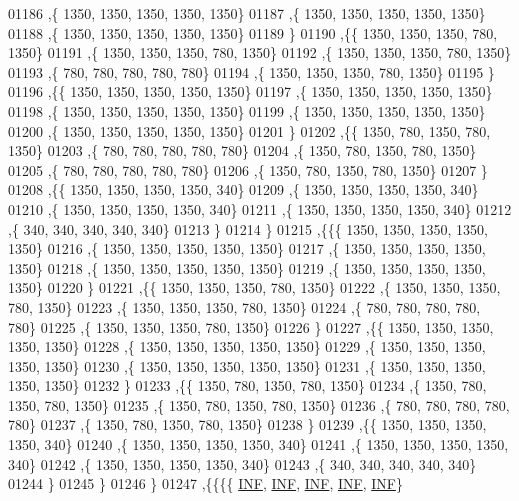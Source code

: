 \begin{DoxyCode}
01186    ,\{  1350,  1350,  1350,  1350,  1350\}
01187    ,\{  1350,  1350,  1350,  1350,  1350\}
01188    ,\{  1350,  1350,  1350,  1350,  1350\}
01189    \}
01190   ,\{\{  1350,  1350,  1350,   780,  1350\}
01191    ,\{  1350,  1350,  1350,   780,  1350\}
01192    ,\{  1350,  1350,  1350,   780,  1350\}
01193    ,\{   780,   780,   780,   780,   780\}
01194    ,\{  1350,  1350,  1350,   780,  1350\}
01195    \}
01196   ,\{\{  1350,  1350,  1350,  1350,  1350\}
01197    ,\{  1350,  1350,  1350,  1350,  1350\}
01198    ,\{  1350,  1350,  1350,  1350,  1350\}
01199    ,\{  1350,  1350,  1350,  1350,  1350\}
01200    ,\{  1350,  1350,  1350,  1350,  1350\}
01201    \}
01202   ,\{\{  1350,   780,  1350,   780,  1350\}
01203    ,\{   780,   780,   780,   780,   780\}
01204    ,\{  1350,   780,  1350,   780,  1350\}
01205    ,\{   780,   780,   780,   780,   780\}
01206    ,\{  1350,   780,  1350,   780,  1350\}
01207    \}
01208   ,\{\{  1350,  1350,  1350,  1350,   340\}
01209    ,\{  1350,  1350,  1350,  1350,   340\}
01210    ,\{  1350,  1350,  1350,  1350,   340\}
01211    ,\{  1350,  1350,  1350,  1350,   340\}
01212    ,\{   340,   340,   340,   340,   340\}
01213    \}
01214   \}
01215  ,\{\{\{  1350,  1350,  1350,  1350,  1350\}
01216    ,\{  1350,  1350,  1350,  1350,  1350\}
01217    ,\{  1350,  1350,  1350,  1350,  1350\}
01218    ,\{  1350,  1350,  1350,  1350,  1350\}
01219    ,\{  1350,  1350,  1350,  1350,  1350\}
01220    \}
01221   ,\{\{  1350,  1350,  1350,   780,  1350\}
01222    ,\{  1350,  1350,  1350,   780,  1350\}
01223    ,\{  1350,  1350,  1350,   780,  1350\}
01224    ,\{   780,   780,   780,   780,   780\}
01225    ,\{  1350,  1350,  1350,   780,  1350\}
01226    \}
01227   ,\{\{  1350,  1350,  1350,  1350,  1350\}
01228    ,\{  1350,  1350,  1350,  1350,  1350\}
01229    ,\{  1350,  1350,  1350,  1350,  1350\}
01230    ,\{  1350,  1350,  1350,  1350,  1350\}
01231    ,\{  1350,  1350,  1350,  1350,  1350\}
01232    \}
01233   ,\{\{  1350,   780,  1350,   780,  1350\}
01234    ,\{  1350,   780,  1350,   780,  1350\}
01235    ,\{  1350,   780,  1350,   780,  1350\}
01236    ,\{   780,   780,   780,   780,   780\}
01237    ,\{  1350,   780,  1350,   780,  1350\}
01238    \}
01239   ,\{\{  1350,  1350,  1350,  1350,   340\}
01240    ,\{  1350,  1350,  1350,  1350,   340\}
01241    ,\{  1350,  1350,  1350,  1350,   340\}
01242    ,\{  1350,  1350,  1350,  1350,   340\}
01243    ,\{   340,   340,   340,   340,   340\}
01244    \}
01245   \}
01246  \}
01247 ,\{\{\{\{   \mbox{\hyperlink{energy__const_8h_a12c2040f25d8e3a7b9e1c2024c618cb6}{INF}},   \mbox{\hyperlink{energy__const_8h_a12c2040f25d8e3a7b9e1c2024c618cb6}{INF}},   \mbox{\hyperlink{energy__const_8h_a12c2040f25d8e3a7b9e1c2024c618cb6}{INF}},   \mbox{\hyperlink{energy__const_8h_a12c2040f25d8e3a7b9e1c2024c618cb6}{INF}},   \mbox{\hyperlink{energy__const_8h_a12c2040f25d8e3a7b9e1c2024c618cb6}{INF}}\}

\end{DoxyCode}
